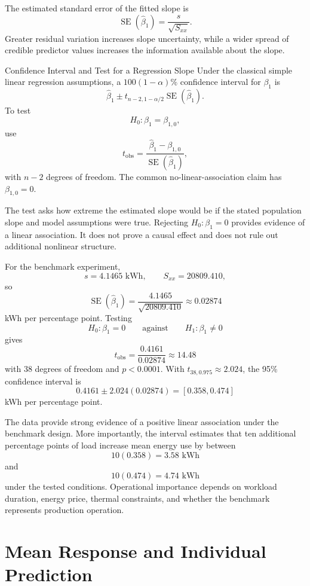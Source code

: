 The estimated standard error of the fitted slope is
\[
\operatorname{SE}(\hat\beta_1)
=\frac{s}{\sqrt{S_{xx}}}.
\]
Greater residual variation increases slope uncertainty, while a wider spread of credible predictor values increases the information available about the slope.

\begin{theorem}{Confidence Interval and Test for a Regression Slope}
Under the classical simple linear regression assumptions, a $100(1-\alpha)\%$ confidence interval for $\beta_1$ is
\[
\hat\beta_1
\pm
t_{n-2,1-\alpha/2}
\operatorname{SE}(\hat\beta_1).
\]
To test
\[
H_0:\beta_1=\beta_{1,0},
\]
use
\[
t_{\mathrm{obs}}
=\frac{\hat\beta_1-\beta_{1,0}}
{\operatorname{SE}(\hat\beta_1)},
\]
with $n-2$ degrees of freedom. The common no-linear-association claim has $\beta_{1,0}=0$.
\end{theorem}

The test asks how extreme the estimated slope would be if the stated population slope and model assumptions were true. Rejecting $H_0:\beta_1=0$ provides evidence of a linear association. It does not prove a causal effect and does not rule out additional nonlinear structure.

\newpage
\begin{example}\par
For the benchmark experiment,
\[
s=4.1465\text{ kWh},
\qquad
S_{xx}=20809.410,
\]
so
\[
\operatorname{SE}(\hat\beta_1)
=\frac{4.1465}{\sqrt{20809.410}}
\approx0.02874
\]
kWh per percentage point. Testing
\[
H_0:\beta_1=0
\qquad\text{against}\qquad
H_1:\beta_1\neq0
\]
gives
\[
t_{\mathrm{obs}}
=\frac{0.4161}{0.02874}
\approx14.48
\]
with 38 degrees of freedom and $p<0.0001$. With $t_{38,0.975}\approx2.024$, the 95\% confidence interval is
\[
0.4161\pm2.024(0.02874)
=[0.358,0.474]
\]
kWh per percentage point.

The data provide strong evidence of a positive linear association under the benchmark design. More importantly, the interval estimates that ten additional percentage points of load increase mean energy use by between
\[
10(0.358)=3.58\text{ kWh}
\]
and
\[
10(0.474)=4.74\text{ kWh}
\]
under the tested conditions. Operational importance depends on workload duration, energy price, thermal constraints, and whether the benchmark represents production operation.
\end{example}

\section{Mean Response and Individual Prediction}
\label{sec:regression-prediction-intervals}

